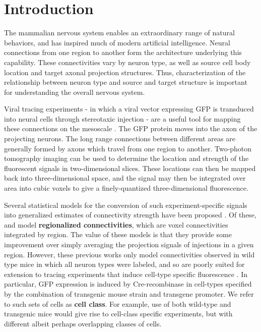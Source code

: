 \section{Introduction}
 
The mammalian nervous system enables an extraordinary range of natural behaviors, and has inspired much of modern artificial intelligence.
Neural connections from one region to another form the architecture underlying this capability.
These connectivities vary by neuron type, as well as source cell body location and target axonal projection structures.
Thus, characterization of the relationship between neuron type and source and target structure is important for understanding the overall nervous system.

Viral tracing experiments - in which a viral vector expressing GFP is transduced into neural cells through stereotaxic injection - are a useful tool for mapping these connections on the mesoscale \citep{Chamberlin1998-hi,Harris2012-fw, Daigle2018-gd}.
The GFP protein moves into the axon of the projecting neurons. The long range connections between different areas are generally formed by axons which travel from one region to another. 
Two-photon tomography imaging can be used to determine the location and strength of the fluorescent signals in two-dimensional slices.
These locations can then be mapped back into three-dimensional space, and the signal may then be integrated over area into cubic voxels to give a finely-quantized three-dimensional fluorescence.

Several statistical models for the conversion of such experiment-specific signals into generalized estimates of connectivity strength have been proposed \citep{Oh2014-kh, Harris2016-fn, Gamanut2018-sd, Knox2019-ot}.
Of these, \citet{Oh2014-kh} and \citet{Knox2019-ot} model \textbf{regionalized connectivities}, which are voxel connectivities integrated by region.
The value of these models is that they provide some improvement over simply averaging the projection signals of injections in a given region.
However, these previous works only model connectivities observed in wild type mice in which all neuron types were labeled, and so are poorly suited for extension to tracing experiments that induce cell-type specific fluorescence \citep{Harris2019-mr}.
In particular, GFP expression is induced by Cre-recombinase in cell-types specified by the combination of transgenic mouse strain and transgene promoter.
We refer to such sets of cells as \textbf{cell class}.
For example, use of both wild-type and transgenic mice would give rise to cell-class specific experiments, but with different albeit perhaps overlapping classes of cells.

